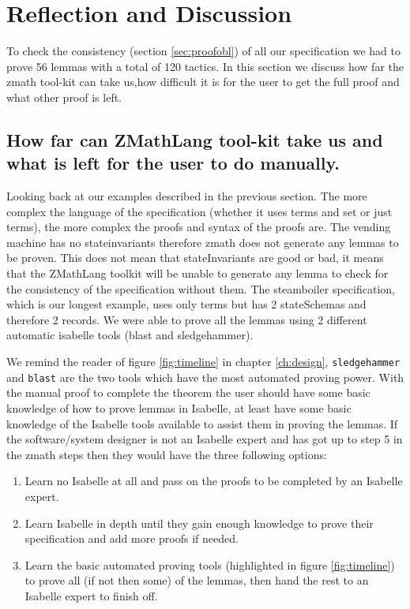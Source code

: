 \section{Reflection and Discussion}

To check the consistency (section \ref{sec:proofobl}) of all our specification we had to prove 56 lemmas with
a total of 120 tactics. In this section we discuss how far the \gls{zmath}
tool-kit can take us,how difficult it is for the user to get the full proof and
what other proof is left.

\subsection{How far can ZMathLang tool-kit take us and what is left for the user to do manually.}

Looking back at our examples described in the previous section. The more
complex the language of the specification (whether it uses terms and set or just
terms), the more complex the proofs and syntax of the proofs are. The vending
machine has no stateinvariants therefore \gls{zmath} does not generate any
lemmas to be proven. This does not mean that stateInvariants are good or bad, it
means that the ZMathLang toolkit will be unable to generate any lemma to check
for the  consistency of the specification without them. The steamboiler specification, which is our longest
example, uses only terms but has 2 stateSchemas and therefore 2 records. We were
able to prove all the lemmas using 2 different automatic isabelle tools (blast
and sledgehammer).

We remind the reader of figure \ref{fig:timeline} in chapter \ref{ch:design},
\verb|sledgehammer| and \verb|blast| are the two tools which have the most
automated proving power. With the manual proof to complete the theorem the user
should have some basic knowledge of how to prove lemmas in Isabelle, at least
have some basic knowledge of the Isabelle tools available to assist them in
proving the lemmas. If the software/system designer is not an Isabelle expert
and has got up to step 5 in the \gls{zmath} steps then they would have the three
following options:

\begin{enumerate}
\item Learn no Isabelle at all and pass on the proofs to be completed by an
Isabelle expert.

\item Learn Isabelle in depth until they gain enough knowledge to prove their
specification and add more proofs if needed.

\item Learn the basic automated proving tools (highlighted in figure
\ref{fig:timeline}) to prove all (if not then some) of the lemmas, then hand the
rest to an Isabelle expert to finish off.
\end{enumerate}

